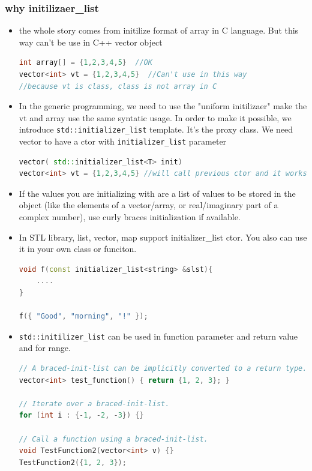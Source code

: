 \documentclass[a4paper,12pt,twoside]{book}
\begin{document}
\subsubsection{why initilizaer\_list}
\begin{itemize}
	\item the whole story comes from initilize format of array in C language. But this way can't be use in C++ vector object
\begin{lstlisting}[frame=single, language=c++,mathescape=true]
int array[] = {1,2,3,4,5}  //OK 
vector<int> vt = {1,2,3,4,5}  //Can't use in this way
//because vt is class, class is not array in C
\end{lstlisting}
	
	\item In the generic programming, we need to use the "uniform initilizaer"  make the vt and array use the same syntatic usage. In order to make it possible, we introduce \texttt{std::initializer\_list} template. It's the proxy class. We need vector to have a ctor with \texttt{initializer\_list} parameter
\begin{lstlisting}[frame=single, language=c++,mathescape=true]
vector( std::initializer_list<T> init)
vector<int> vt = {1,2,3,4,5} //will call previous ctor and it works. 
\end{lstlisting}
	
	\item If the values you are initializing with are a list of values to be stored in the object (like the elements of a vector/array, or real/imaginary part of a complex number), use curly braces initialization if available.
	
	\item In STL library, list, vector, map support initializer\_list ctor. You also can use it in your own class or funciton.
\begin{lstlisting}[frame=single, language=c++,mathescape=true]
void f(const initializer_list<string> &slst){
	....
}
	
f({ "Good", "morning", "!" });
\end{lstlisting}
	
	\item \texttt{std::initilizer\_list} can be used in function parameter and return value and for range.  
\begin{lstlisting}[frame=single, language=c++,mathescape=true]
// A braced-init-list can be implicitly converted to a return type.
vector<int> test_function() { return {1, 2, 3}; }
	
// Iterate over a braced-init-list.
for (int i : {-1, -2, -3}) {}
	
// Call a function using a braced-init-list.
void TestFunction2(vector<int> v) {}
TestFunction2({1, 2, 3}); 
\end{lstlisting}

\end{itemize}
\end{document}
